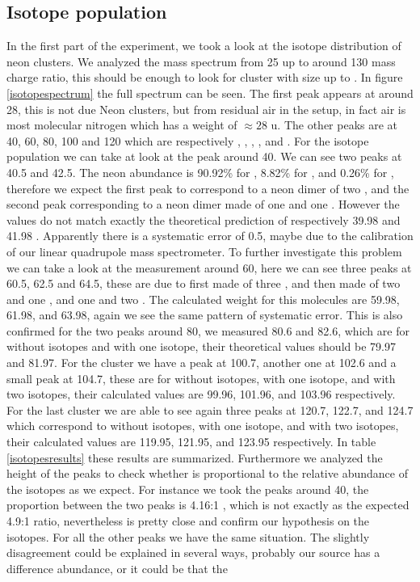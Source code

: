 \documentclass[a4paper,10pt]{article}
\begin{document}
\subsection{Isotope population}\label{section:isotopes}
In the first part of the experiment, we took a look at the isotope distribution of neon clusters. We analyzed the mass spectrum from 25 up to around 130 mass charge ratio, this should be enough to look for cluster with size up to . In figure \ref{isotopespectrum} the full spectrum can be seen. The first peak appears at around 28, this is not due Neon clusters, but from residual air in the setup, in fact air is most molecular nitrogen  which has a weight of $\approx 28$ u. The other peaks are at 40, 60, 80, 100 and 120 which are respectively , , , , and . For the isotope population we can take at look at the peak around 40. We can see two peaks at 40.5 and 42.5. The neon abundance is 90.92\% for , 8.82\% for , and 0.26\% for  \cite{script}, therefore we expect the first peak to correspond to a neon dimer of two , and the second peak corresponding to a neon dimer made of one  and one . However the values do not match exactly the theoretical prediction of respectively 39.98 and 41.98 \cite{umc}. Apparently there is a systematic error of 0.5, maybe due to the calibration of our linear quadrupole mass spectrometer. To further investigate this problem we can take a look at the measurement around 60, here we can see three peaks at 60.5, 62.5 and 64.5, these are due to  first made of three , and then made of two  and one , and one  and two . The calculated weight for this molecules are 59.98, 61.98, and 63.98, again we see the same pattern of systematic error. This is also confirmed for the two peaks around 80, we measured 80.6 and 82.6, which are for  without isotopes and  with one  isotope, their theoretical values should be 79.97 and 81.97. For the cluster  we have a peak at 100.7, another one at 102.6 and a small peak at 104.7, these are for  without isotopes,  with one  isotope, and  with two  isotopes, their calculated values are 99.96, 101.96, and 103.96 respectively. For the last cluster  we are able to see again three peaks at 120.7, 122.7, and 124.7 which correspond to  without isotopes,  with one  isotope, and  with two  isotopes, their calculated values are 119.95, 121.95, and 123.95 respectively. In table \ref{isotopesresults} these results are summarized.  Furthermore we analyzed the height of the peaks to check whether is proportional to the relative abundance of the isotopes as we expect. For instance we took the peaks around 40, the proportion between the two peaks is 4.16:1 , which is not exactly as the expected 4.9:1 ratio, nevertheless is pretty close and confirm our hypothesis on the isotopes. For all the other peaks we have the same situation. The slightly disagreement could be explained in several ways, probably our source has a difference abundance, or it could be that the 
\end{document}
